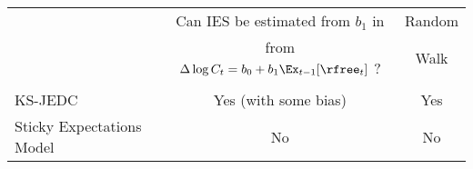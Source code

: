 \begin{center}

\begin{tabular}{l|cc}
\hline
   & Can IES be estimated from $b_{1}$ in  & Random \\
   & from $\Delta \log C_{t} = b_0 + b_{1}  \Ex_{t-1}[\rfree_{t}]$ ?  & Walk \\ \hline
   \\
   KS-JEDC                           & Yes (with some bias)& Yes  \\
   Sticky Expectations Model         & No  & No \\ \hline
\end{tabular}

\end{center} 
